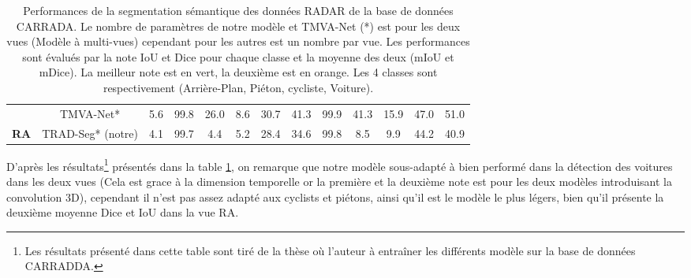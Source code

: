 \begin{table}[hbt!]
{\begin{tabular}{ccccccccccccc}
                                 & TMVA-Net*                                 & 5.6                                                                                           & 99.8                    & {\color[HTML]{009901} 26.0} & {\color[HTML]{FFC702} 8.6}                          & \multicolumn{1}{c|}{{\color[HTML]{009901} 30.7}}                         & \multicolumn{1}{c|}{{\color[HTML]{009901} 41.3}}                         & 99.9                    & {\color[HTML]{009901} 41.3}                         & {\color[HTML]{FFC702} 15.9} & \multicolumn{1}{c|}{{\color[HTML]{009901} 47.0}} & {\color[HTML]{009901} 51.0} \\
  \multirow{-7}{*}{\textbf{RA}}  & \cellcolor[HTML]{C0C0C0}TRAD-Seg* (notre) & {\color[HTML]{32CB00}4.1 }                                                                   & 99.7                    & 4.4                         & 5.2                                                 & \multicolumn{1}{c|}{{\color[HTML]{FFC702} 28.4}}                         & \multicolumn{1}{c|}{{\color[HTML]{FFC702} 34.6}}                         & 99.8                    & 8.5                                                 & 9.9                         & \multicolumn{1}{c|}{{\color[HTML]{FFC702} 44.2}} & {\color[HTML]{FFC702} 40.9} \\ \hline
  \end{tabular}%
  }
  \caption{Performances de la segmentation sémantique des données RADAR de la base de données CARRADA. Le nombre de paramètres de notre modèle et TMVA-Net (*) est pour les deux vues (Modèle à multi-vues) cependant pour les autres est un nombre par vue. Les performances sont évalués par la note IoU et Dice pour chaque classe et la moyenne des deux (mIoU et mDice). La meilleur note est en vert, la deuxième est en orange. Les 4 classes sont respectivement (Arrière-Plan, Piéton, cycliste, Voiture).}
  \label{tab:46}
  \end{table}

D'après les résultats\footnote{Les résultats présenté dans cette table sont tiré de la thèse \cite{25} où l'auteur à entraîner les différents modèle sur la base de données CARRADDA\cite{6}.} présentés dans la table \ref{tab:46}, on remarque que notre modèle sous-adapté à bien performé dans la détection des voitures dans les deux vues (Cela est grace à la dimension temporelle or la première et la deuxième note est pour les deux modèles introduisant la convolution 3D), cependant il n'est pas assez adapté aux cyclists et piétons, ainsi qu'il est le modèle le plus légers, bien qu'il présente la deuxième moyenne Dice et IoU dans la vue RA.


